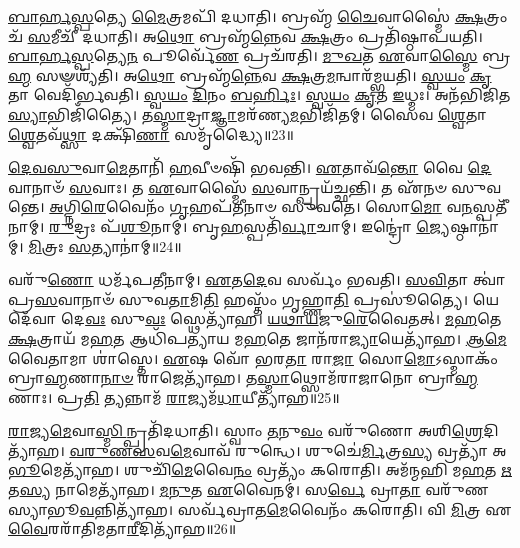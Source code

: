 \-\ul{𑌬𑌾}\-\-\ul{𑌰𑍍}\-\-\ul{𑌹}\-\-\ul{𑌸𑍍𑌪}\-𑌤𑍍𑌯𑍇 \ul{𑌮𑍈}\-𑌤𑍍𑌰𑌮𑌪𑌿᳴ 𑌦𑌧𑌾𑌤𑌿।
𑌬𑍍𑌰𑌹𑍍𑌮᳴ \ul{𑌚𑍈}\-𑌵𑌾𑌸𑍍𑌮𑍈॑ \ul{𑌕𑍍𑌷}\-𑌤𑍍𑌰𑌂 𑌚᳴ \ul{𑌸}\-𑌮𑍀𑌚𑍀᳴ 𑌦𑌧𑌾𑌤𑌿।
𑌅\-\ul{𑌥𑍋} 𑌬𑍍𑌰𑌹𑍍𑌮᳴\-\ul{𑌨𑍍𑌨𑍇}\-𑌵 \ul{𑌕𑍍𑌷}\-𑌤𑍍𑌰𑌂 𑌪𑍍𑌰𑌤𑌿᳴\-𑌷𑍍𑌠𑌾𑌪𑌯𑌤𑌿।
\-\ul{𑌬𑌾}\-\-\ul{𑌰𑍍}\-\-\ul{𑌹}\-\-\ul{𑌸𑍍𑌪}\-𑌤𑍍𑌯𑍇\-\ul{𑌨} 𑌪𑍂𑌰𑍍𑌵𑍇᳴\-\ul{𑌣} 𑌪𑍍𑌰𑌚᳴𑌰𑌤𑌿।
\-\ul{𑌮𑍁}\-\-\ul{𑌖}\-𑌤 \ul{𑌏}\-𑌵𑌾\-\ul{𑌸𑍍𑌮𑍈} 𑌬𑍍𑌰\-\ul{𑌹𑍍𑌮} 𑌸𑍟𑌶𑍍𑌯᳴𑌤𑌿।
𑌅\-\ul{𑌥𑍋} 𑌬𑍍𑌰𑌹𑍍𑌮᳴\-\ul{𑌨𑍍𑌨𑍇}\-𑌵 \ul{𑌕𑍍𑌷}\-𑌤𑍍𑌰\-\ul{𑌮}\-𑌨𑍍𑌵𑌾𑌰᳴𑌮𑍍𑌭𑌯𑌤𑌿।
\-\ul{𑌸𑍍𑌵}\-\-\ul{𑌯𑌂} \ul{𑌕𑍃}\-𑌤𑌾 𑌵𑍇𑌦𑌿᳴𑌰𑍍𑌭𑌵𑌤𑌿।
\-\ul{𑌸𑍍𑌵}\-\-\ul{𑌯𑌂} \ul{𑌦𑌿}\-𑌨𑌂 \ul{𑌬}\-\-\ul{𑌰𑍍}\-𑌹𑌿𑌃।
\-\ul{𑌸𑍍𑌵}\-\-\ul{𑌯𑌂} \ul{𑌕𑍃}\-𑌤 \ul{𑌇}\-𑌧𑍍𑌮𑌃।
𑌅𑌨᳴𑌭𑌿𑌜𑌿𑌤\-\ul{𑌸𑍍𑌯𑌾}\-𑌭𑌿𑌜𑌿᳴𑌤𑍍𑌯𑍈।
𑌤\-\ul{𑌸𑍍𑌮𑌾}\-𑌦𑍍𑌰𑌾\-\ul{𑌜𑍍𑌞𑌾}\-𑌮𑌰᳴𑌣𑍍𑌯\-\ul{𑌮}\-𑌭𑌿𑌜𑌿᳴𑌤𑌮𑍍।
𑌸𑍈𑌵 \ul{𑌶𑍍𑌵𑍇}\-𑌤𑌾 \ul{𑌶𑍍𑌵𑍇}\-𑌤𑌵᳴\-\ul{𑌥𑍍𑌸𑌾} 𑌦𑌕𑍍𑌷𑌿᳴\-\ul{𑌣𑌾} 𑌸𑌮𑍃᳴𑌦𑍍𑌧𑍍𑌯𑍈॥23॥\anuvakamend[\-\ul{𑌰}\-\-\ul{𑌤𑍍𑌨𑌿}\-𑌤𑍍𑌵𑌾\-\ul{𑌯} 𑌸𑌮𑍃᳴𑌦𑍍𑌧𑍍𑌯𑍈 𑌪\-\ul{𑌷𑍍𑌠𑍗}\-𑌹𑍀 𑌦𑌕𑍍𑌷𑌿᳴\-\ul{𑌣𑌾} 𑌸𑌮𑍃᳴𑌦𑍍𑌧𑍍𑌯𑍈 𑌗𑍍𑌰𑌾\-\ul{𑌮}\-𑌣𑍍𑌯𑍋᳴ \ul{𑌗𑍃}\-𑌹𑍇 𑌭𑌾᳴𑌗\-\ul{𑌦𑍁}\-𑌘𑌸𑍍𑌯᳴ \ul{𑌗𑍃}\-𑌹𑍇 𑌭᳴𑌵𑌤𑌿 \ul{𑌦𑍁}\-𑌗𑍍𑌧𑍇᳴\-𑌽𑌭𑌿𑌜𑌿᳴\-\ul{𑌤𑍍𑌯𑍈} 𑌦𑍍𑌵𑍇 𑌚᳴]

\-\ul{𑌦𑍇}\-\-\ul{𑌵}\-\-\ul{𑌸𑍁}\-𑌵𑌾\-\ul{𑌮𑍇}\-𑌤𑌾𑌨𑌿᳴ \ul{𑌹}\-𑌵𑍀𑍞𑌷𑌿᳴ 𑌭𑌵𑌨𑍍𑌤𑌿।
\-\ul{𑌏}\-𑌤𑌾𑌵᳴\-\ul{𑌨𑍍𑌤𑍋} 𑌵𑍈 \ul{𑌦𑍇}\-𑌵𑌾𑌨𑌾𑍞᳴ \ul{𑌸}\-𑌵𑌾𑌃।
𑌤 \ul{𑌏}\-𑌵𑌾𑌸𑍍𑌮𑍈᳴ \ul{𑌸}\-𑌵𑌾𑌨𑍍𑌪𑍍𑌰𑌯᳴𑌚𑍍𑌛𑌨𑍍𑌤𑌿।
𑌤 𑌏᳴𑌨𑍞 𑌸𑍁𑌵𑌨𑍍𑌤𑍇।
\-\ul{𑌅}\-𑌗𑍍𑌨𑌿\-\ul{𑌰𑍇}\-𑌵𑍈𑌨𑌂᳴ \ul{𑌗𑍃}\-𑌹𑌪᳴𑌤𑍀𑌨𑌾𑍞 𑌸𑍁𑌵𑌤𑍇।
𑌸𑍋\-\ul{𑌮𑍋} 𑌵\-\ul{𑌨}\-𑌸𑍍𑌪𑌤𑍀᳴𑌨𑌾𑌮𑍍।
\-\ul{𑌰𑍁}\-𑌦𑍍𑌰𑌃 𑌪᳴\-\ul{𑌶𑍂}\-𑌨𑌾𑌮𑍍।
𑌬𑍃\-\ul{𑌹}\-𑌸𑍍𑌪𑌤𑌿᳴\-\ul{𑌰𑍍𑌵𑌾}\-𑌚𑌾𑌮𑍍।
𑌇𑌨𑍍𑌦𑍍𑌰𑍋॑ \ul{𑌜𑍍𑌯𑍇}\-𑌷𑍍𑌠𑌾𑌨𑌾॑𑌮𑍍।
\-\ul{𑌮𑌿}\-𑌤𑍍𑌰𑌃 \ul{𑌸}\-𑌤𑍍𑌯𑌾𑌨𑌾॑𑌮𑍍॥24॥

𑌵𑌰𑍁᳴\-\ul{𑌣𑍋} 𑌧𑌰𑍍𑌮᳴𑌪𑌤𑍀𑌨𑌾𑌮𑍍।
\-\ul{𑌏}\-𑌤\-\ul{𑌦𑍇}\-𑌵 𑌸𑌰𑍍𑌵𑌂᳴ 𑌭𑌵𑌤𑌿।
\-\ul{𑌸}\-\-\ul{𑌵𑌿}\-𑌤𑌾 𑌤𑍍𑌵𑌾॑ 𑌪𑍍𑌰\-\ul{𑌸}\-𑌵𑌾𑌨𑌾𑍞᳴ 𑌸𑍁𑌵\-\ul{𑌤𑌾}\-𑌮𑌿\-\ul{𑌤𑌿} 𑌹𑌸𑍍𑌤𑌂᳴ 𑌗𑍃𑌹𑍍𑌣𑌾\-\ul{𑌤𑌿} 𑌪𑍍𑌰𑌸𑍂॑𑌤𑍍𑌯𑍈।
𑌯𑍇 𑌦𑍇᳴𑌵𑌾 𑌦𑍇\-\ul{𑌵𑌃} 𑌸𑍁\-\ul{𑌵𑌃} 𑌸𑍍𑌥𑍇𑌤𑍍𑌯𑌾᳴𑌹।
\-\ul{𑌯}\-\-\ul{𑌥𑌾}\-\-\ul{𑌯}\-𑌜𑍁\-\ul{𑌰𑍇}\-𑌵𑍈𑌤𑌤𑍍।
\-\ul{𑌮}\-\-\ul{𑌹}\-𑌤𑍇 \ul{𑌕𑍍𑌷}\-𑌤𑍍𑌰𑌾𑌯᳴ 𑌮\-\ul{𑌹}\-𑌤 𑌆𑌧𑌿᳴𑌪𑌤𑍍𑌯𑌾𑌯 𑌮\-\ul{𑌹}\-𑌤𑍇 𑌜𑌾𑌨᳴𑌰𑌾\-\ul{𑌜𑍍𑌯𑌾}\-𑌯𑍇𑌤𑍍𑌯𑌾᳴𑌹।
\-\ul{𑌆}\-\-\-\ul{𑌮𑍇}\-𑌵𑍈𑌤𑌾𑌮𑌾 𑌶𑌾॑𑌸𑍍𑌤𑍇।
\-\ul{𑌏}\-𑌷 𑌵𑍋᳴ 𑌭𑌰\-\ul{𑌤𑌾} 𑌰𑌾\-\ul{𑌜𑌾} 𑌸𑍋\-\ul{𑌮𑍋}\-\-𑌽𑌸𑍍𑌮𑌾𑌕𑌂᳴ 𑌬𑍍𑌰𑌾\-\ul{𑌹𑍍𑌮}\-𑌣𑌾\-\ul{𑌨𑌾}\-\-\ul{𑍞} 𑌰𑌾𑌜𑍇𑌤𑍍𑌯𑌾᳴𑌹।
𑌤\-\ul{𑌸𑍍𑌮𑌾}\-𑌥𑍍𑌸𑍋𑌮᳴𑌰𑌾𑌜𑌾𑌨𑍋 𑌬𑍍𑌰𑌾\-\ul{𑌹𑍍𑌮}\-𑌣𑌾𑌃।
𑌪𑍍𑌰\-\ul{𑌤𑌿} 𑌤𑍍𑌯𑌨𑍍𑌨𑌾𑌮᳴ \ul{𑌰𑌾}\-𑌜𑍍𑌯𑌮᳴\-\ul{𑌧𑌾}\-𑌯𑍀𑌤𑍍𑌯𑌾᳴𑌹॥25॥

\-\ul{𑌰𑌾}\-𑌜𑍍𑌯\-\ul{𑌮𑍇}\-𑌵𑌾\-\ul{𑌸𑍍𑌮𑌿}\-𑌨𑍍𑌪𑍍𑌰𑌤𑌿᳴\-𑌦𑌧𑌾𑌤𑌿।
𑌸𑍍𑌵𑌾𑌂 \ul{𑌤}\-𑌨𑍁\-\ul{𑌵𑌂} 𑌵𑌰𑍁᳴𑌣𑍋 𑌅𑌶𑌿\-\ul{𑌶𑍍𑌰𑍇}\-𑌦𑌿\-𑌤𑍍𑌯𑌾᳴𑌹।
\-\ul{𑌵}\-\-\ul{𑌰𑍁}\-\-\ul{𑌣}\-\-\ul{𑌸}\-𑌵\-\ul{𑌮𑍇}\-𑌵𑌾𑌵᳴ 𑌰𑍁𑌨𑍍𑌧𑍇।
𑌶𑍁𑌚𑍇॑\-\ul{𑌰𑍍𑌮𑌿}\-𑌤𑍍𑌰\-\ul{𑌸𑍍𑌯} 𑌵𑍍𑌰𑌤𑍍𑌯𑌾᳴ 𑌅\-\ul{𑌭𑍂}\-𑌮𑍇𑌤𑍍𑌯𑌾᳴𑌹।
𑌶𑍁𑌚𑌿᳴\-\ul{𑌮𑍇}\-𑌵𑍈\-\ul{𑌨𑌂} 𑌵𑍍𑌰𑌤𑍍𑌯𑌂᳴ 𑌕𑌰𑍋𑌤𑌿।
𑌅𑌮᳴𑌨𑍍𑌮𑌹𑌿 𑌮\-\ul{𑌹}\-𑌤 \ul{𑌋}\-𑌤\-\ul{𑌸𑍍𑌯} 𑌨𑌾𑌮𑍇𑌤𑍍𑌯𑌾᳴𑌹।
\-\ul{𑌮}\-\-\ul{𑌨𑍁}\-𑌤 \ul{𑌏}\-𑌵𑍈𑌨𑌮𑍍॑।
𑌸\-\ul{𑌰𑍍𑌵𑍇} 𑌵𑍍𑌰𑌾\-\ul{𑌤𑌾} 𑌵𑌰𑍁᳴𑌣𑌸𑍍𑌯𑌾𑌭𑍂\-\ul{𑌵}\-𑌨𑍍𑌨𑌿𑌤𑍍𑌯𑌾᳴𑌹।
𑌸𑌰𑍍𑌵᳴𑌵𑍍𑌰𑌾𑌤\-\ul{𑌮𑍇}\-𑌵𑍈𑌨𑌂᳴ 𑌕𑌰𑍋𑌤𑌿।
𑌵𑌿 \ul{𑌮𑌿}\-𑌤𑍍𑌰 𑌏\-\ul{𑌵𑍈}\-𑌰𑌰𑌾᳴𑌤𑌿𑌮𑌤𑌾\-\ul{𑌰𑍀}\-𑌦𑌿𑌤𑍍𑌯𑌾᳴𑌹॥26॥

